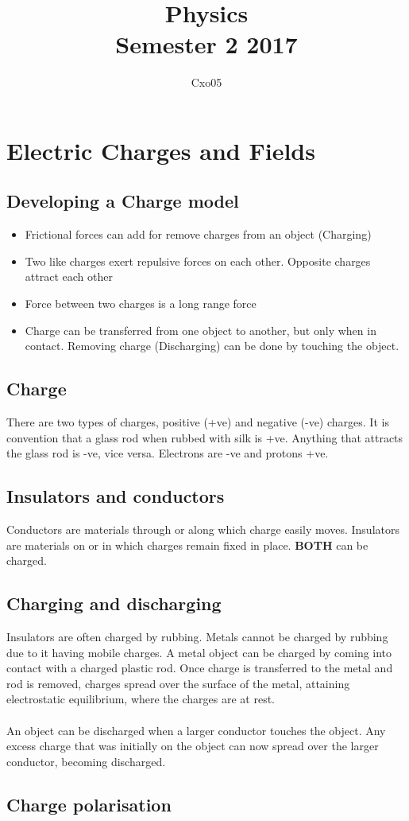 \documentclass[a4paper]{article}
\begin{document}
\title{
Physics \\
\large Semester 2 2017
}
\author{Cxo05}

\maketitle

\section{Electric Charges and Fields}
\subsection{Developing a Charge model}
\begin{itemize}
\item Frictional forces can add for remove charges from an object (Charging)
\item Two like charges exert repulsive forces on each other. Opposite charges attract each other
\item Force between two charges is a long range force
\item Charge can be transferred from one object to another, but only when in contact. Removing charge (Discharging) can be done by touching the object.
\end{itemize}
\subsection{Charge}
There are two types of charges, positive (+ve) and negative (-ve) charges.
It is convention that a glass rod when rubbed with silk is +ve. Anything that attracts the glass rod is -ve, vice versa. Electrons are -ve and protons +ve. 
\subsection{Insulators and conductors}
Conductors are materials through or along which charge easily moves. Insulators are materials on or in which charges remain fixed in place. \textbf{BOTH} can be charged.
\subsection{Charging and discharging}
Insulators are often charged by rubbing. Metals cannot be charged by rubbing due to it having mobile charges. A metal object can be charged by coming into contact with a charged plastic rod. Once charge is transferred to the metal and rod is removed, charges spread over the surface of the metal, attaining electrostatic equilibrium, where the charges are at rest. \\\\
An object can be discharged when a larger conductor touches the object. Any excess charge that was initially on the object can now spread over the larger conductor, becoming discharged. 
\subsection{Charge polarisation}
 
\end{document}
